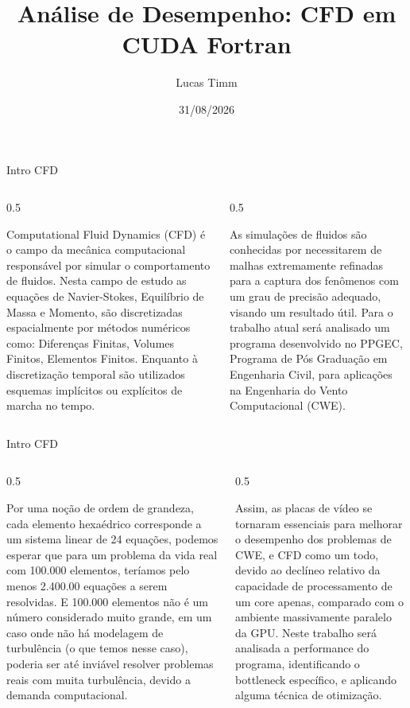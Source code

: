 \documentclass[t]{beamer}
\title{Análise de Desempenho: CFD em CUDA Fortran}
\author{Lucas Timm}
\date{31/08/2026}
\begin{document}
\maketitle

\newcommand{\inframe}[2]{
    \begin{frame}{#1}
        #2
    \end{frame}
}

\newcommand{\intwocols}[2]{
    \begin{columns}
        \begin{column}{0.5\textwidth}
            #1
        \end{column}
        \begin{column}{0.5\textwidth}
            #2
        \end{column}
    \end{columns}
}


\newcommand{\ttwocframe}[3]{
    \inframe{#1}{\intwocols{#2}{#3}}
}

\newcommand{\twocframe}[2]{
    \inframe{}{#1}{#2}
}

\ttwocframe 
{Intro CFD}
{
    Computational Fluid Dynamics (CFD)  é o campo da mecânica computacional responsável por simular o comportamento de fluidos. Nesta campo de estudo as equações de Navier-Stokes, Equilíbrio de Massa e Momento, são discretizadas espacialmente por métodos numéricos como: Diferenças Finitas, Volumes Finitos, Elementos Finitos. Enquanto à discretização temporal são utilizados esquemas implícitos ou explícitos de marcha no tempo.
}
{
    As simulações de fluidos são conhecidas por necessitarem de malhas extremamente refinadas para a captura dos fenômenos com um grau de precisão adequado, visando um resultado útil. Para o trabalho atual será analisado um programa desenvolvido no PPGEC, Programa de Pós Graduação em Engenharia Civil, para aplicações na Engenharia do Vento Computacional (CWE). 
}

\ttwocframe
{Intro CFD}
{
    Por uma noção de ordem de grandeza, cada elemento hexaédrico corresponde a um sistema linear de 24 equações, podemos esperar que para um problema da vida real com 100.000 elementos, teríamos pelo menos 2.400.00 equações a serem resolvidas. E 100.000 elementos não é um número considerado muito grande, em um caso onde não há modelagem de turbulência (o que temos nesse caso), poderia ser até inviável resolver problemas reais com muita turbulência, devido a demanda computacional.
}
{
    Assim, as placas de vídeo se tornaram essenciais para melhorar o desempenho dos problemas de CWE, e CFD como um todo, devido ao declíneo relativo da capacidade de processamento de um core apenas, comparado com o ambiente massivamente paralelo da GPU. Neste trabalho será analisada a performance do programa, identificando o bottleneck específico, e aplicando alguma técnica de otimização.
}
\end{document}

